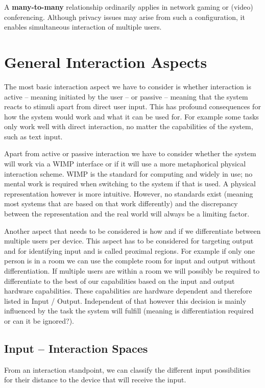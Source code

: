 \documentclass{acm_proc_article-sp}
\begin{document}
A \textbf{many-to-many} relationship ordinarily applies in network gaming or (video) conferencing. Although privacy issues may arise from such a configuration, it enables simultaneous interaction of multiple users.

\section{General Interaction Aspects}

The most basic interaction aspect we have to consider is whether interaction is active – meaning initiated by the user – or passive – meaning that the system reacts to stimuli apart from direct user input.
This has profound consequences for how the system would work and what it can be used for.
For example some tasks only work well with direct interaction, no matter the capabilities of the system, such as text input.

Apart from active or passive interaction we have to consider whether the system will work via a WIMP interface or if it will use a more metaphorical physical interaction scheme.
WIMP is the standard for computing and widely in use; no mental work is required when switching to the system if that is used.
A physical representation however is more intuitive.
However, no standards exist (meaning most systems that are based on that work differently) and the discrepancy between the representation and the real world will always be a limiting factor.

Another aspect that needs to be considered is how and if we differentiate between multiple users per device.
This aspect has to be considered for targeting output and for identifying input and is called proximal regions.
For example if only one person is in a room we can use the complete room for input and output without differentiation.
If multiple users are within a room we will possibly be required to differentiate to the best of our capabilities based on the input and output hardware capabilities.
These capabilities are hardware dependent and therefore listed in Input / Output.
Independent of that however this decision is mainly influenced by the task the system will fulfill (meaning is differentiation required or can it be ignored?).

\subsection{Input – Interaction Spaces}

From an interaction standpoint, we can classify the different input possibilities for their distance to the device that will receive the input.
\end{document}
